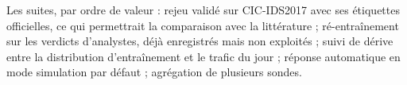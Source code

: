 \documentclass[11pt,a4paper]{article}
\begin{document}
Les suites, par ordre de valeur : rejeu validé sur CIC-IDS2017 avec ses étiquettes officielles, ce
qui permettrait la comparaison avec la littérature ; ré-entraînement sur les verdicts d'analystes,
déjà enregistrés mais non exploités ; suivi de dérive entre la distribution d'entraînement et le
trafic du jour ; réponse automatique en mode simulation par défaut ; agrégation de plusieurs sondes.
\end{document}
